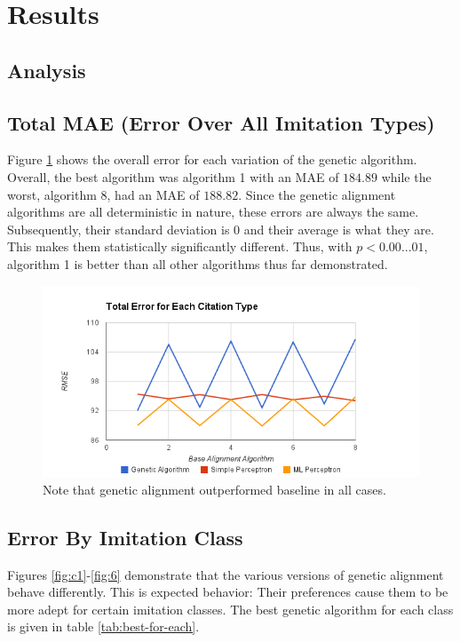 \section {Results}
\label{results}

\subsection {Analysis} 

\subsection{Total MAE (Error Over All Imitation Types)}
Figure \ref{fig:overall} shows the overall error for each variation of the genetic algorithm. Overall, the best algorithm was algorithm 1 with an MAE of $184.89$ while the worst, algorithm 8, had an MAE of $188.82$. Since the genetic alignment algorithms are all deterministic in nature, these errors are always the same. Subsequently, their standard deviation is 0 and their average is what they are. This makes them statistically significantly different. Thus, with $p < 0.00...01$, algorithm 1 is better than all other algorithms thus far demonstrated.

\begin{figure}[center]
	\centering
	\includegraphics[width=16cm]{images/error_type_all_imitations.png}
	\caption{Note that genetic alignment outperformed baseline in all cases.}
	\label{fig:overall}
\end{figure}

\subsection{Error By Imitation Class}
Figures \ref{fig:c1}-\ref{fig:6} demonstrate that the various versions of genetic alignment behave differently. This is expected behavior: Their preferences cause them to be more adept for certain imitation classes. The best genetic algorithm for each class is given in table \ref{tab:best-for-each}.

